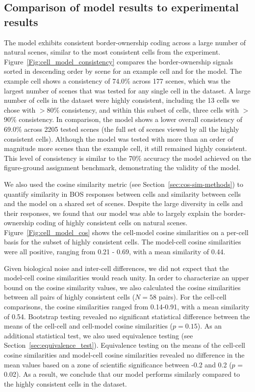 \subsection{Comparison of model results to experimental results}
The model exhibits consistent border-ownership coding across a large number of natural scenes, similar to the most consistent cells from the experiment. Figure~\ref{Fig:cell_model_consistency} compares the border-ownership signals sorted in descending order by scene for an example cell and for the model. The example cell shows a consistency of 74.0\% across 177 scenes, which was the largest number of scenes that was tested for any single cell in the dataset. A large number of cells in the dataset were highly consistent, including the 13 cells we chose with $>$80\% consistency, and within this subset of cells, three cells with $>$90\% consistency. In comparison, the model shows a lower overall consistency of 69.0\% across 2205 tested scenes (the full set of scenes viewed by all the highly consistent cells). Although the model was tested with more than an order of magnitude more scenes than the example cell, it still remained highly consistent. This level of consistency is similar to the 70\% accuracy the model achieved on the figure-ground assignment benchmark, demonstrating the validity of the model.

We also used the cosine similarity metric (see Section~\ref{sec:cos-sim-methods}) to quantify similarity in BOS responses between cells and similarity between cells and the model on a shared set of scenes. Despite the large diversity in cells and their responses, we found that our model was able to largely explain the border-ownership coding of highly consistent cells on natural scenes.
%
Figure~\ref{Fig:cell_model_cos} shows the cell-model cosine similarities on a per-cell basis for the subset of highly consistent cells. The model-cell cosine similarities were all positive, ranging from 0.21 - 0.69, with a mean similarity of 0.44.

Given biological noise and inter-cell differences, we did not expect that the model-cell cosine similarities would reach unity. In order to characterize an upper bound on the cosine similarity values, we also calculated the cosine similarities between all pairs of highly consistent cells ($N = 58$ pairs). For the cell-cell comparisons, the cosine similarities ranged from 0.14-0.91, with a mean similarity of 0.54. 
Bootstrap testing revealed no significant statistical difference between the means of the cell-cell and cell-model cosine similarities ($p = 0.15$).
%
As an additional statistical test, we also used equivalence testing (see Section~\ref{sec:equivalence_test}). Equivalence testing on the means of the cell-cell cosine similarities and model-cell cosine similarities revealed no difference in the mean values based on a zone of scientific significance between -0.2 and 0.2 ($p$ = 0.02). As a result, we conclude that our model performs similarly compared to the highly consistent cells in the dataset.

